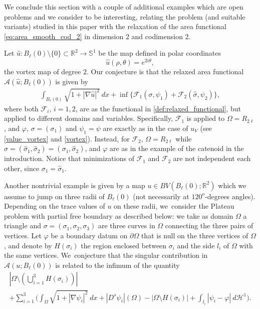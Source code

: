 \documentclass[JEP,XML,SOM,Unicode, NoFloatCountersInSection,published]{cedram}
\newcommand{\R}{\mathbb{R}}
\let\Om\Omega
\theoremstyle{definition}
\begin{document}
We conclude this section with a couple of additional
examples which are open problems and we consider to be interesting, relating the problem
(and suitable variants) studied in this paper with the relaxation
of the area functional \eqref{eq:area_smooth_cod_2}
in dimension $2$ and codimension $2$.

Let $\widehat u:B_\ell(0)\setminus\{0\}\subset\R^2\to \mathbb S^1$ be the map defined in polar coordinates
\[
\widehat u(\rho,\theta)=e^{2i\theta},
\]
\ie the vortex map of degree $2$. Our conjecture is
that the relaxed area functional $\mathcal A(\widehat u;B_\ell(0)) $ is given by
\begin{align}\label{value_vortex2}
\int_{B_\ell(0)}\sqrt{1+|\nabla \widehat u|^2}~dx+\inf\{\mathcal F_1(\sigma,\psi_1)+\mathcal F_2(\widehat \sigma,\psi_2)\},
\end{align}
where both $\mathcal F_i$, $i=1,2$, are as the functional in \eqref{def:relaxed_functional}, but applied to different domains and variables. Specifically, $\mathcal F_1$ is applied to $\Om=R_{2\ell}$, and $\varphi$, $\sigma=(\sigma_1)$ and $\psi_1=\psi$ are exactly as in the case of $u_V$ (see \eqref{value_vortex} and \eqref{vortex}). Instead, for $\mathcal F_2$, $\Om=R_{2\ell}$ while $\widehat \sigma=(\widehat \sigma_1,\widehat\sigma_2)=( \sigma_1,\widehat\sigma_2)$, and $\varphi$ are as in the example of the catenoid in the introduction. Notice that minimizations of $\mathcal F_1$ and $\mathcal F_2$ are not independent each other, since $\sigma_1=\widehat \sigma_1$.

Another nontrivial example is given by a map $u\in BV(B_\ell(0);\R^2)$ which we assume to jump on three radii of $ B_\ell(0)$ (not necessarily
at $120^o$-degrees angles). Depending on the trace values of $u$ on these radii, we~consider the Plateau problem with partial free boundary as described below: we take as domain $\Om$ a triangle and $\sigma=(\sigma_1,\sigma_2,\sigma_3)$ are three curves in $\Om$ connecting the three pairs of vertices. Let $\varphi$ be a boundary datum on $\partial \Om$ that is null on the three vertices of $\Om$, and denote by $H(\sigma_i)$ the region enclosed between $\sigma_i$ and the side $l_i$ of $\Om$ with the same vertices. We~conjecture that the singular contribution in $\mathcal A(u;B_\ell(0))$ is related to the infimum of the quantity
\begin{multline*}\textstyle
|\Om\setminus (\bigcup_{i=1}^3H(\sigma_i))|\\
+ \sum_{i=1}^3\biggl(\int_\Om\sqrt{1+|\nabla\psi_i|^2}~dx+|D^s\psi_i|(\Om)-|\Om\setminus H(\sigma_i)|+\int_{l_i}|\psi_i-\varphi|~d\mathcal H^1\biggr).
\end{multline*}
\end{document}
